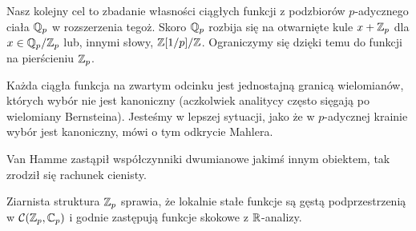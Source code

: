 Nasz kolejny cel to zbadanie własności ciągłych funkcji z podzbiorów $p$-adycznego ciała $\mathbb Q_p$ w rozszerzenia tegoż.
Skoro $\mathbb Q_p$ rozbija się na otwarnięte kule $x + \mathbb Z_p$ dla $x \in \mathbb Q_p/\mathbb Z_p$ lub, innymi słowy, $\mathbb Z[1/p] / \mathbb Z$.
Ograniczymy się dzięki temu do funkcji na pierścieniu $\mathbb Z_p$.

Każda ciągła funkcja na zwartym odcinku jest jednostajną granicą wielomianów, których wybór nie jest kanoniczny (aczkolwiek analitycy często sięgają po wielomiany Bernsteina).
Jesteśmy w lepszej sytuacji, jako że w $p$-adycznej krainie wybór jest kanoniczny, mówi o tym odkrycie Mahlera.

Van Hamme zastąpił współczynniki dwumianowe jakimś innym obiektem, tak zrodził się rachunek cienisty.

Ziarnista struktura $\mathbb Z_p$ sprawia, że lokalnie stałe funkcje są gęstą podprzestrzenią w $\mathcal C(\mathbb Z_p, \mathbb C_p)$ i godnie zastępują funkcje skokowe z $\mathbb R$-analizy.